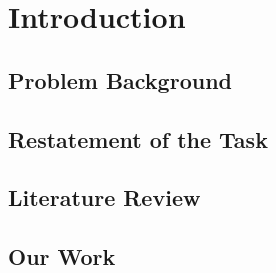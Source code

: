\section{Introduction}
\subsection{Problem Background}
\subsection{Restatement of the Task}
\subsection{Literature Review}
\subsection{Our Work}